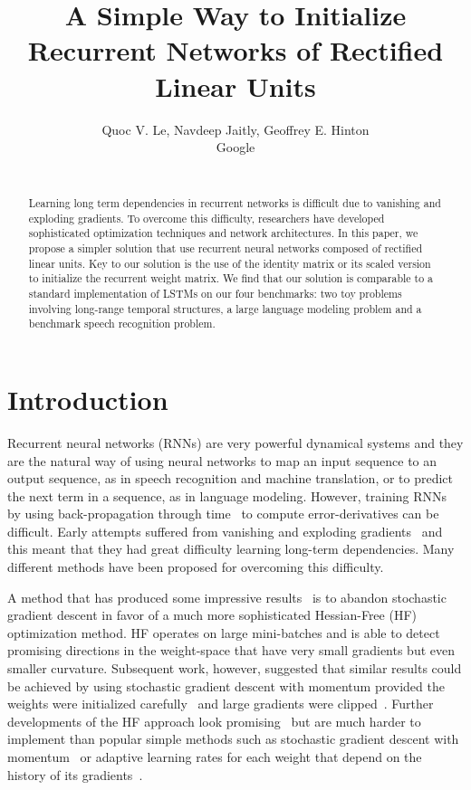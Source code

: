 \documentclass{article} \usepackage{nips14submit_e,times,graphicx}
\title{A Simple Way to Initialize Recurrent  Networks of Rectified Linear Units}
\author{ Quoc V. Le, Navdeep Jaitly, Geoffrey E.
  Hinton\\ Google\\ \\ }
\begin{document}
\maketitle

\begin{abstract}
  Learning long term dependencies in recurrent networks is difficult
  due to vanishing and exploding gradients.  To overcome this
  difficulty, researchers have developed sophisticated optimization
  techniques and network architectures. In this paper, we propose a
  simpler solution that use recurrent neural networks composed of
  rectified linear units.  Key to our solution is the use of the
  identity matrix or its scaled version to initialize the recurrent
  weight matrix. We find that our solution is comparable to a standard
  implementation of LSTMs on our four benchmarks: two toy problems
  involving long-range temporal structures, a large language modeling
  problem and a benchmark speech recognition problem.
\end{abstract}


\section{Introduction}

Recurrent neural networks (RNNs) are very powerful dynamical systems
and they are the natural way of using neural networks to map an input
sequence to an output sequence, as in speech recognition and machine
translation, or to predict the next term in a sequence, as in language
modeling.  However, training RNNs by using back-propagation through
time~\cite{rumelhart1986learning} to compute error-derivatives can be
difficult. Early attempts suffered from vanishing and exploding
gradients~\cite{hoch01} and this meant that they had great difficulty
learning long-term dependencies.  Many different methods have been
proposed for overcoming this difficulty.


A method that has produced some impressive
results~\cite{martens2010deep,martens11} is to abandon stochastic
gradient descent in favor of a much more sophisticated Hessian-Free
(HF) optimization method.  HF operates on large mini-batches and is
able to detect promising directions in the weight-space that have very
small gradients but even smaller curvature. Subsequent work, however,
suggested that similar results could be achieved by using stochastic
gradient descent with momentum provided the weights were initialized
carefully~\cite{sutskever2013importance} and large gradients were
clipped~\cite{pascanu2012difficulty}.  Further developments of the HF
approach look promising~\cite{sutskever2011generating,martens12} but
are much harder to implement than popular simple methods such as
stochastic gradient descent with
momentum~\cite{sutskever2013importance} or adaptive learning rates for
each weight that depend on the history of its
gradients~\cite{duchi2011adaptive,hinton12b}.
\end{document}
